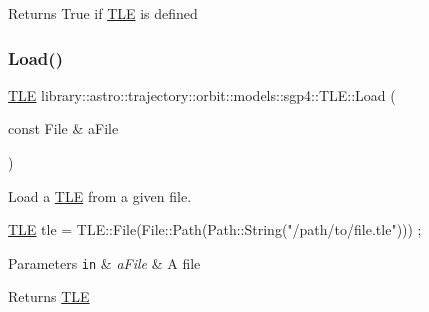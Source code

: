 \begin{DoxyReturn}{Returns}
True if \hyperlink{classlibrary_1_1astro_1_1trajectory_1_1orbit_1_1models_1_1sgp4_1_1_t_l_e}{T\+LE} is defined 
\end{DoxyReturn}
\mbox{\label{classlibrary_1_1astro_1_1trajectory_1_1orbit_1_1models_1_1sgp4_1_1_t_l_e_a573d75ef5c2b7ed157dce83fdb556d44}} 
\subsubsection{\texorpdfstring{Load()}{Load()}}
{\footnotesize\ttfamily \hyperlink{classlibrary_1_1astro_1_1trajectory_1_1orbit_1_1models_1_1sgp4_1_1_t_l_e}{T\+LE} library\+::astro\+::trajectory\+::orbit\+::models\+::sgp4\+::\+T\+L\+E\+::\+Load (\begin{DoxyParamCaption}\item[{const File \&}]{a\+File }\end{DoxyParamCaption})\hspace{0.3cm}{\ttfamily [static]}}



Load a \hyperlink{classlibrary_1_1astro_1_1trajectory_1_1orbit_1_1models_1_1sgp4_1_1_t_l_e}{T\+LE} from a given file. 


\begin{DoxyCode}
\hyperlink{classlibrary_1_1astro_1_1trajectory_1_1orbit_1_1models_1_1sgp4_1_1_t_l_e_a4d2b43f02cef44f0c9635daf9946261c}{TLE} tle = TLE::File(File::Path(Path::String(\textcolor{stringliteral}{"/path/to/file.tle"}))) ;
\end{DoxyCode}



\begin{DoxyParams}[1]{Parameters}
\mbox{\tt in}  & {\em a\+File} & A file \\
\hline
\end{DoxyParams}
\begin{DoxyReturn}{Returns}
\hyperlink{classlibrary_1_1astro_1_1trajectory_1_1orbit_1_1models_1_1sgp4_1_1_t_l_e}{T\+LE} 
\end{DoxyReturn}
\mbox{\label{classlibrary_1_1astro_1_1trajectory_1_1orbit_1_1models_1_1sgp4_1_1_t_l_e_a92dd1db5b23bbb86f46960c830dcdae3}} 
